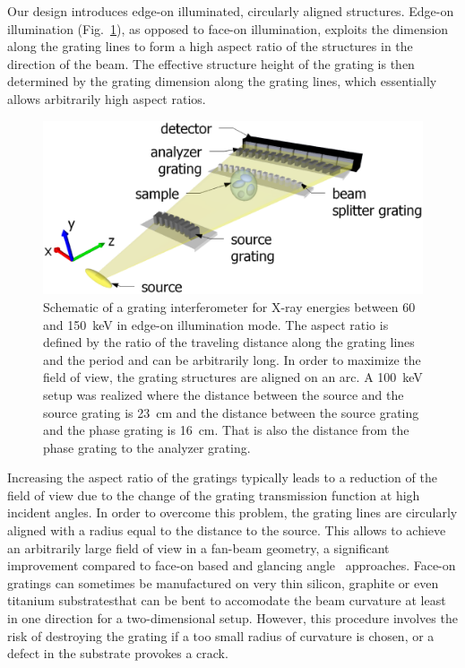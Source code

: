Our design introduces edge-on illuminated,  circularly aligned structures.
Edge-on illumination (Fig.~\ref{fig:schematic}), as
opposed to face-on illumination, exploits the dimension along the grating
lines to form a high aspect ratio of the structures in the direction of the beam. The
effective structure height of the grating is then determined by the grating
dimension along the grating lines, which essentially allows arbitrarily high
aspect ratios. 
\begin{figure}[h!]
    \centering
    \includegraphics[width=\textwidth]{gfx/figure1.eps}
    \caption{Schematic of a grating
        interferometer for X-ray energies between 60 and
        \SI{150}{\kilo\electronvolt} in edge-on illumination mode. The
        aspect ratio is defined by the ratio of the traveling distance along the
        grating lines and the period and can be arbitrarily long. In order to maximize
        the field of view, the grating structures are aligned on an
        arc. A \SI{100}{\kilo\eV} setup was realized where the distance
        between the source and the source grating is \SI{23}{\centi\metre}
    and the distance between the source grating and the phase grating is
    \SI{16}{\centi\metre}. That is also the distance from the phase grating
to the analyzer grating.}%
\label{fig:schematic}
\end{figure}

Increasing the aspect ratio of the gratings typically leads to a reduction
of the field of view due to the change of the grating transmission function
at high incident angles. In order to overcome this problem, the grating
lines are circularly aligned with a radius equal to the distance to the
source. This allows to achieve an arbitrarily large field of view in a
fan-beam geometry, a significant improvement compared to face-on based and
glancing angle~\cite{Stutman2012a} approaches.
Face-on gratings can sometimes be manufactured on very thin silicon,
graphite or even titanium substrates\cn that can be bent to accomodate the beam
curvature at least in one direction for a two-dimensional setup. However,
this procedure involves the risk of destroying the grating if a too small
radius of curvature is chosen, or a defect in the substrate provokes a
crack.                                                

